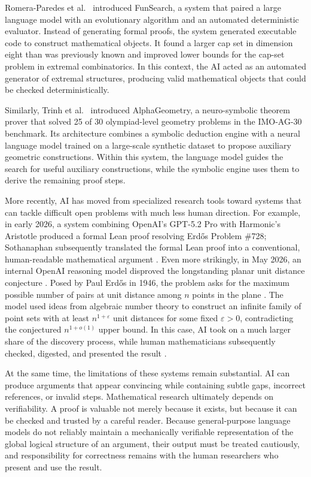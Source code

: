 \documentclass[12pt]{article}
\begin{document}
Romera-Paredes et al.~\cite{romera2024} introduced FunSearch, a system that paired a large language model with an evolutionary algorithm and an automated deterministic evaluator. Instead of generating formal proofs, the system generated executable code to construct mathematical objects. It found a larger cap set in dimension eight than was previously known and improved lower bounds for the cap-set problem in extremal combinatorics. In this context, the AI acted as an automated generator of extremal structures, producing valid mathematical objects that could be checked deterministically.

Similarly, Trinh et al.~\cite{trinh2024} introduced AlphaGeometry, a neuro-symbolic theorem prover that solved 25 of 30 olympiad-level geometry problems in the IMO-AG-30 benchmark. Its architecture combines a symbolic deduction engine with a neural language model trained on a large-scale synthetic dataset to propose auxiliary geometric constructions. Within this system, the language model guides the search for useful auxiliary constructions, while the symbolic engine uses them to derive the remaining proof steps.

More recently, AI has moved from specialized research tools toward systems that can tackle difficult open problems with much less human direction. For example, in early 2026, a system combining OpenAI's GPT-5.2 Pro with Harmonic's Aristotle produced a formal Lean proof resolving Erdős Problem \#728; Sothanaphan subsequently translated the formal Lean proof into a conventional, human-readable mathematical argument \cite{sothanaphan2026}. Even more strikingly, in May 2026, an internal OpenAI reasoning model disproved the longstanding planar unit distance conjecture \cite{openai2026}. Posed by Paul Erdős in 1946, the problem asks for the maximum possible number of pairs at unit distance among $n$ points in the plane \cite{erdos1946}. The model used ideas from algebraic number theory to construct an infinite family of point sets with at least $n^{1+\varepsilon}$ unit distances for some fixed $\varepsilon>0$, contradicting the conjectured $n^{1+o(1)}$ upper bound. In this case, AI took on a much larger share of the discovery process, while human mathematicians subsequently checked, digested, and presented the result \cite{openai2026,alon2026}.

At the same time, the limitations of these systems remain substantial. AI can produce arguments that appear convincing while containing subtle gaps, incorrect references, or invalid steps. Mathematical research ultimately depends on verifiability. A proof is valuable not merely because it exists, but because it can be checked and trusted by a careful reader. Because general-purpose language models do not reliably maintain a mechanically verifiable representation of the global logical structure of an argument, their output must be treated cautiously, and responsibility for correctness remains with the human researchers who present and use the result.
\end{document}
